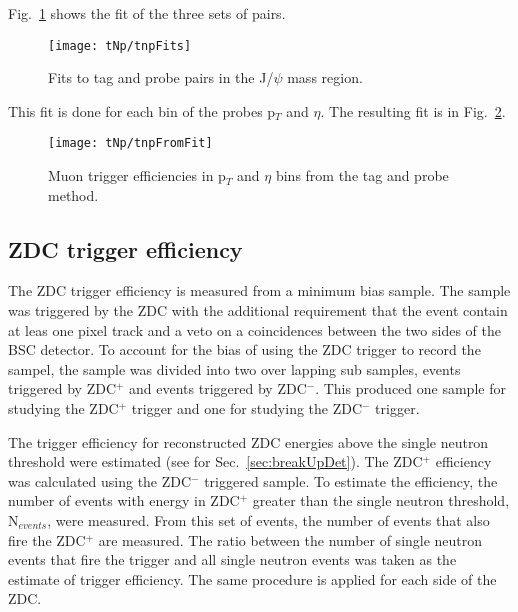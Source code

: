         Fig.~\ref{fig:tnpFitPlot} shows the fit of the three sets of pairs. 
        \begin{figure}[!Hh]
          \centering
          \texttt{[image: tNp/tnpFits]}
          \caption{Fits to tag and probe pairs in the J/$\psi$ mass region.}
          \label{fig:tnpFitPlot}
        \end{figure}
        This fit is done for each bin of the probes p$_{T}$ and $\eta$.
        The resulting fit is in Fig.~\ref{fig:tnpTrigMap}.
        \begin{figure}[!Hhbt]
          \centering
          \texttt{[image: tNp/tnpFromFit]}
          \caption{Muon trigger efficiencies in p$_{T}$ and $\eta$ bins from 
            the tag and probe method.}
          \label{fig:tnpTrigMap}
        \end{figure}

      \subsection{ZDC trigger efficiency}
        The ZDC trigger efficiency is measured from a minimum bias sample. 
        The sample was triggered by the ZDC with the additional requirement
          that the event contain at leas one pixel track and a veto on a 
          coincidences between the two sides of the BSC detector.
        To account for the bias of using the ZDC trigger to record the sampel, 
          the sample was divided into two over lapping sub samples, events 
          triggered by ZDC$^{+}$ and events triggered by ZDC$^{-}$. 
        This produced one sample for studying the ZDC$^{+}$ trigger and one for
          studying the ZDC$^{-}$ trigger.

        The trigger efficiency for reconstructed ZDC energies above the
          single neutron threshold were estimated (see for Sec.~\ref{sec:breakUpDet}).
        The ZDC$^{+}$ efficiency was calculated using the ZDC$^{-}$ triggered 
          sample.
        To estimate the efficiency, the number of events with energy in 
          ZDC$^{+}$ greater than the single neutron threshold, N$_{events}$, 
          were measured.
        From this set of events, the number of events that also fire the 
          ZDC$^{+}$ are measured.
        The ratio between the number of single neutron events that fire the 
          trigger and all single neutron events was taken as the estimate of 
          trigger efficiency. 
        The same procedure is applied for each side of the ZDC. 

